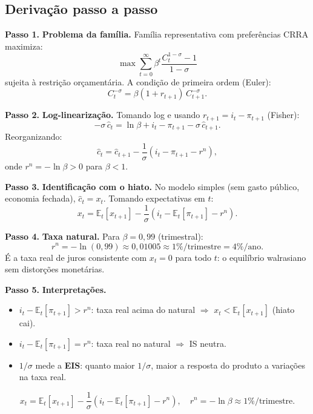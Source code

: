 \documentclass[12pt, a4paper]{article}
\newcommand{\E}{\mathbb{E}}
\begin{document}
\subsection*{Derivação passo a passo}

\textbf{Passo 1.} \textbf{Problema da família.}
Família representativa com preferências CRRA maximiza:
\[
\max\sum_{t=0}^\infty\beta^t\frac{C_t^{1-\sigma}-1}{1-\sigma}
\]
sujeita à restrição orçamentária. A condição de primeira ordem (Euler):
\[
C_t^{-\sigma} = \beta(1+r_{t+1})\,C_{t+1}^{-\sigma}.
\]

\textbf{Passo 2.} \textbf{Log-linearização.}
Tomando log e usando $r_{t+1} = i_t - \pi_{t+1}$ (Fisher):
\[
-\sigma\,\hat{c}_t = \ln\beta + i_t - \pi_{t+1} - \sigma\,\hat{c}_{t+1}.
\]
Reorganizando:
\[
\hat{c}_t = \hat{c}_{t+1} - \frac{1}{\sigma}(i_t - \pi_{t+1} - r^n),
\]
onde $r^n = -\ln\beta > 0$ para $\beta < 1$.

\textbf{Passo 3.} \textbf{Identificação com o hiato.}
No modelo simples (sem gasto público, economia fechada), $\hat{c}_t = x_t$.
Tomando expectativas em $t$:
\begin{equation}
x_t = \E_t[x_{t+1}] - \frac{1}{\sigma}(i_t - \E_t[\pi_{t+1}] - r^n).
\label{eq:is_q6}
\end{equation}

\textbf{Passo 4.} \textbf{Taxa natural.}
Para $\beta = 0{,}99$ (trimestral):
\[
r^n = -\ln(0{,}99) \approx 0{,}01005 \approx 1\%/\text{trimestre} = 4\%/\text{ano}.
\]
É a taxa real de juros consistente com $x_t = 0$ para todo $t$: o equilíbrio walrasiano
sem distorções monetárias.

\textbf{Passo 5.} \textbf{Interpretações.}
\begin{itemize}[leftmargin=1.5em, itemsep=2pt]
  \item $i_t - \E_t[\pi_{t+1}] > r^n$: taxa real acima do natural $\Rightarrow$
        $x_t < \E_t[x_{t+1}]$ (hiato cai).
  \item $i_t - \E_t[\pi_{t+1}] = r^n$: taxa real no natural $\Rightarrow$ IS neutra.
  \item $1/\sigma$ mede a \textbf{EIS}: quanto maior $1/\sigma$, maior a resposta
        do produto a variações na taxa real.
\end{itemize}

\begin{resultbox}[title={IS Dinâmica e Taxa Natural (Q6)}]
\[
x_t = \E_t[x_{t+1}] - \frac{1}{\sigma}(i_t - \E_t[\pi_{t+1}] - r^n),\quad
r^n = -\ln\beta \approx 1\%/\text{trimestre}.
\]
\end{resultbox}
\end{document}
